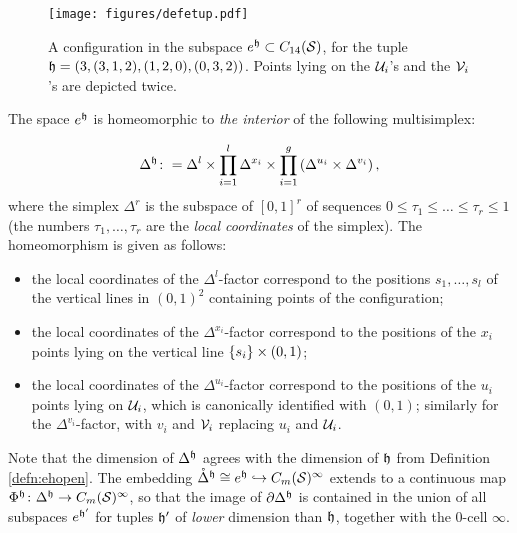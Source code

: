 \begin{figure}\centering
 \texttt{[image: figures/defetup.pdf]}
 \caption{A configuration in the subspace $e^{\mathfrak{h}}\subset C_{14}(\mathcal{S})$, for the tuple $\mathfrak{h}=(3,(3,1,2),(1,2,0),(0,3,2))$. Points
 lying on the $\mathcal{U}_i$'s and the $\mathcal{V}_i$'s are depicted twice.}
\label{fig:defetup}
\end{figure}


The space $e^{\mathfrak{h}}$ is homeomorphic to \emph{the interior} of the following multisimplex:

\[
 \Delta^{\mathfrak{h}}\colon =
 \Delta^l\times\prod_{i=1}^l\Delta^{x_i}\times\prod_{i=1}^g\left(\Delta^{u_i}\times\Delta^{v_i}\right),
\]
where the simplex $\Delta^r$ is the subspace of $[0,1]^r$ of sequences $0\leq \tau_1\leq\dots\leq\tau_r\leq 1$
(the numbers $\tau_1,\dots,\tau_r$ are the \emph{local coordinates} of the simplex). The homeomorphism is given
as follows:
\begin{itemize}
 \item the local coordinates of the $\Delta^l$-factor correspond to the positions $s_1,\dots,s_l$ of the vertical
 lines in $(0,1)^2$ containing points of the configuration;
 \item the local coordinates of the $\Delta^{x_i}$-factor correspond to the positions of the $x_i$ points
 lying on the vertical line $\left\{s_i\right\}\times(0,1)$;
 \item the local coordinates of the $\Delta^{u_i}$-factor correspond to the positions of the $u_i$ points
 lying on $\mathcal{U}_i$, which is canonically identified with $(0,1)$; similarly for the $\Delta^{v_i}$-factor,
 with $v_i$ and $\mathcal{V}_i$ replacing $u_i$ and $\mathcal{U}_i$.
\end{itemize}
Note that the dimension of $\Delta^{\mathfrak{h}}$ agrees with the dimension of $\mathfrak{h}$ from Definition \ref{defn:ehopen}.
The embedding $\mathring{\Delta}^{\mathfrak{h}}\cong e^{\mathfrak{h}}\hookrightarrow C_m(\mathcal{S})^{\infty}$ extends to a continuous map
$\Phi^{\mathfrak{h}}\colon\Delta^{\mathfrak{h}}\to C_m(\mathcal{S})^{\infty}$, so that the image of $\partial\Delta^{\mathfrak{h}}$ is contained in the union of
all subspaces $e^{\mathfrak{h}'}$ for tuples $\mathfrak{h}'$ of \emph{lower} dimension than $\mathfrak{h}$, together with the $0$-cell $\infty$.

